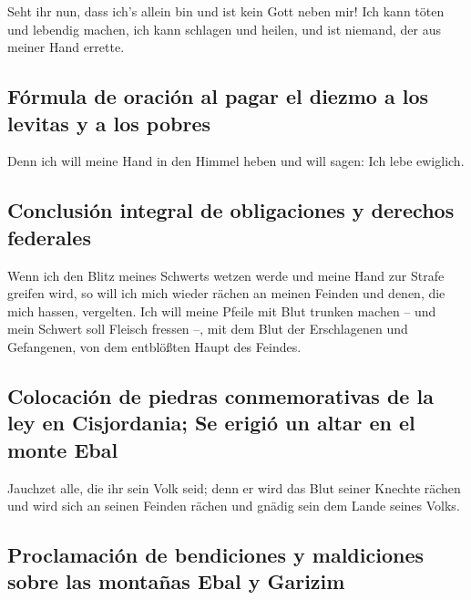  Seht ihr nun, dass ich's allein bin und ist kein Gott
neben mir! Ich kann töten und lebendig machen, ich kann schlagen und
heilen, und ist niemand, der aus meiner Hand errette.

\hypertarget{fuxf3rmula-de-oraciuxf3n-al-pagar-el-diezmo-a-los-levitas-y-a-los-pobres}{%
\subsection{Fórmula de oración al pagar el diezmo a los levitas y a los
pobres}\label{fuxf3rmula-de-oraciuxf3n-al-pagar-el-diezmo-a-los-levitas-y-a-los-pobres}}

 Denn ich will meine Hand in den Himmel heben und will
sagen: Ich lebe ewiglich.

\hypertarget{conclusiuxf3n-integral-de-obligaciones-y-derechos-federales}{%
\subsection{Conclusión integral de obligaciones y derechos
federales}\label{conclusiuxf3n-integral-de-obligaciones-y-derechos-federales}}

 Wenn ich den Blitz meines Schwerts wetzen werde und
meine Hand zur Strafe greifen wird, so will ich mich wieder rächen an
meinen Feinden und denen, die mich hassen, vergelten. 
Ich will meine Pfeile mit Blut trunken machen -- und mein Schwert soll
Fleisch fressen --, mit dem Blut der Erschlagenen und Gefangenen, von
dem entblößten Haupt des Feindes.

\hypertarget{colocaciuxf3n-de-piedras-conmemorativas-de-la-ley-en-cisjordania-se-erigiuxf3-un-altar-en-el-monte-ebal}{%
\subsection{Colocación de piedras conmemorativas de la ley en
Cisjordania; Se erigió un altar en el monte
Ebal}\label{colocaciuxf3n-de-piedras-conmemorativas-de-la-ley-en-cisjordania-se-erigiuxf3-un-altar-en-el-monte-ebal}}

 Jauchzet alle, die ihr sein Volk seid; denn er wird das
Blut seiner Knechte rächen und wird sich an seinen Feinden rächen und
gnädig sein dem Lande seines Volks.

\hypertarget{proclamaciuxf3n-de-bendiciones-y-maldiciones-sobre-las-montauxf1as-ebal-y-garizim}{%
\subsection{Proclamación de bendiciones y maldiciones sobre las montañas
Ebal y
Garizim}\label{proclamaciuxf3n-de-bendiciones-y-maldiciones-sobre-las-montauxf1as-ebal-y-garizim}}

